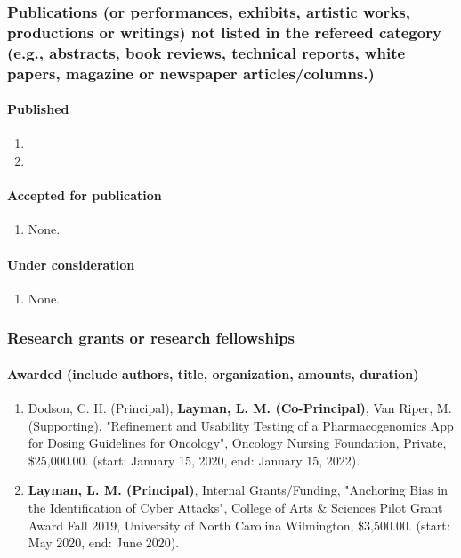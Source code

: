 \documentclass[10pt]{article}
\begin{document}
\subsubsection{Publications (or performances, exhibits, artistic works, productions or writings) not listed in the refereed category (e.g., abstracts, book reviews, technical reports, white papers, magazine or newspaper articles/columns.)}
\paragraph{Published}
\begin{enumerate}
    \item {}
    \item {}
\end{enumerate}

\paragraph{Accepted for publication}
\begin{enumerate}
    \item None.
\end{enumerate}

\paragraph{Under consideration}
\begin{enumerate}
    \item None.
\end{enumerate}



\subsubsection{Research grants or research fellowships}
\paragraph{Awarded (include authors, title, organization, amounts, duration)}
\begin{enumerate}
    \item Dodson, C. H. (Principal), \textbf{Layman, L. M. (Co-Principal)}, Van Riper, M. (Supporting), "Refinement and Usability Testing of a Pharmacogenomics App for Dosing Guidelines for Oncology", Oncology Nursing Foundation, Private, \$25,000.00. (start: January 15, 2020, end: January 15, 2022).
    \item \textbf{Layman, L. M. (Principal)}, Internal Grants/Funding, "Anchoring Bias in the Identification of Cyber Attacks", College of Arts \& Sciences Pilot Grant Award Fall 2019, University of North Carolina Wilmington, \$3,500.00. (start: May 2020, end: June 2020).    
\end{enumerate}
\end{document}
